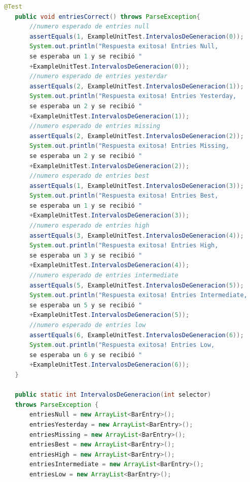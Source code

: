 \begin{lstlisting}[language= Java, frame=single]
   @Test
   public void entriesCorrect() throws ParseException{
       //numero esperado de entries null
       assertEquals(1, ExampleUnitTest.IntervalosDeGeneracion(0));
       System.out.println("Respuesta exitosa! Entries Null,
       se esperaba un 1 y se recibió "
       +ExampleUnitTest.IntervalosDeGeneracion(0));
       //numero esperado de entries yesterdar
       assertEquals(2, ExampleUnitTest.IntervalosDeGeneracion(1));
       System.out.println("Respuesta exitosa! Entries Yesterday,
       se esperaba un 2 y se recibió "
       +ExampleUnitTest.IntervalosDeGeneracion(1));
       //numero esperado de entries missing
       assertEquals(2, ExampleUnitTest.IntervalosDeGeneracion(2));
       System.out.println("Respuesta exitosa! Entries Missing,
       se esperaba un 2 y se recibió "
       +ExampleUnitTest.IntervalosDeGeneracion(2));
       //numero esperado de entries best
       assertEquals(1, ExampleUnitTest.IntervalosDeGeneracion(3));
       System.out.println("Respuesta exitosa! Entries Best,
       se esperaba un 1 y se recibió "
       +ExampleUnitTest.IntervalosDeGeneracion(3));
       //numero esperado de entries high
       assertEquals(3, ExampleUnitTest.IntervalosDeGeneracion(4));
       System.out.println("Respuesta exitosa! Entries High,
       se esperaba un 3 y se recibió "
       +ExampleUnitTest.IntervalosDeGeneracion(4));
       //numero esperado de entries intermediate
       assertEquals(5, ExampleUnitTest.IntervalosDeGeneracion(5));
       System.out.println("Respuesta exitosa! Entries Intermediate,
       se esperaba un 5 y se recibió "
       +ExampleUnitTest.IntervalosDeGeneracion(5));
       //numero esperado de entries low
       assertEquals(6, ExampleUnitTest.IntervalosDeGeneracion(6));
       System.out.println("Respuesta exitosa! Entries Low,
       se esperaba un 6 y se recibió "
       +ExampleUnitTest.IntervalosDeGeneracion(6));
   }

   public static int IntervalosDeGeneracion(int selector)
   throws ParseException {
       entriesNull = new ArrayList<BarEntry>();
       entriesYesterday = new ArrayList<BarEntry>();
       entriesMissing = new ArrayList<BarEntry>();
       entriesBest = new ArrayList<BarEntry>();
       entriesHigh = new ArrayList<BarEntry>();
       entriesIntermediate = new ArrayList<BarEntry>();
       entriesLow = new ArrayList<BarEntry>();


\end{lstlisting}
